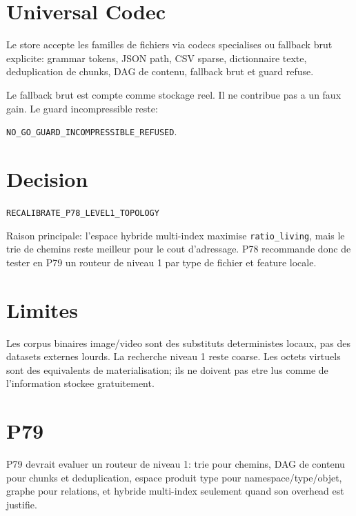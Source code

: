 \documentclass[a4paper,11pt]{article}
\newcommand{\Decision}{\texttt{RECALIBRATE\_P78\_LEVEL1\_TOPOLOGY}}
\begin{document}
\section{Universal Codec}

Le store accepte les familles de fichiers via codecs specialises ou fallback
brut explicite: grammar tokens, JSON path, CSV sparse, dictionnaire texte,
deduplication de chunks, DAG de contenu, fallback brut et guard refuse.

Le fallback brut est compte comme stockage reel. Il ne contribue pas a un faux
gain. Le guard incompressible reste:

\texttt{NO\_GO\_GUARD\_INCOMPRESSIBLE\_REFUSED}.

\section{Decision}

\Decision

Raison principale: l'espace hybride multi-index maximise \texttt{ratio\_living}, mais
le trie de chemins reste meilleur pour le cout d'adressage. P78 recommande donc
de tester en P79 un routeur de niveau 1 par type de fichier et feature locale.

\section{Limites}

Les corpus binaires image/video sont des substituts deterministes locaux, pas
des datasets externes lourds. La recherche niveau 1 reste coarse. Les octets
virtuels sont des equivalents de materialisation; ils ne doivent pas etre lus
comme de l'information stockee gratuitement.

\section{P79}

P79 devrait evaluer un routeur de niveau 1: trie pour chemins, DAG de contenu
pour chunks et deduplication, espace produit type pour namespace/type/objet,
graphe pour relations, et hybride multi-index seulement quand son overhead est
justifie.
\end{document}
